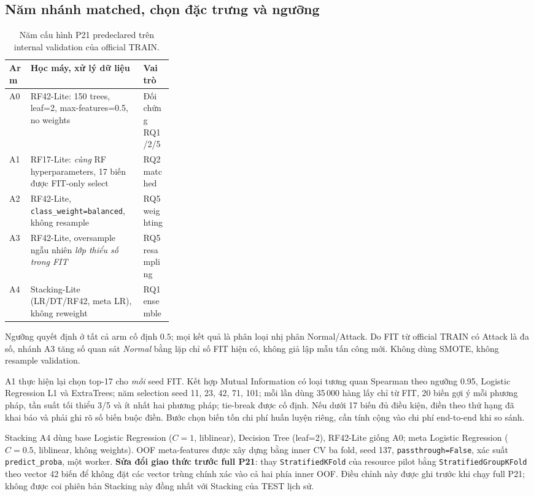 \subsection{Năm nhánh matched, chọn đặc trưng và ngưỡng}
\begin{table}[htbp]\centering\small
\renewcommand{\arraystretch}{1.20}
\setlength{\tabcolsep}{5pt}
\caption{Năm cấu hình P21 predeclared trên internal validation của official TRAIN.}
\label{tab:p21-arms-method}
\begin{tabularx}{\linewidth}{p{0.13\linewidth}X p{0.18\linewidth}}
\toprule
Arm & Học máy, xử lý dữ liệu & Vai trò\\\midrule
A0 & RF42-Lite: 150 trees, leaf=2, max-features=0.5, no weights & Đối chứng RQ1/2/5\\
A1 & RF17-Lite: \emph{cùng} RF hyperparameters, 17 biến được FIT-only select & RQ2 matched\\
A2 & RF42-Lite, \texttt{class\_weight=balanced}, không resample & RQ5 weighting\\
A3 & RF42-Lite, oversample ngẫu nhiên \emph{lớp thiểu số trong FIT} & RQ5 resampling\\
A4 & Stacking-Lite (LR/DT/RF42, meta LR), không reweight & RQ1 ensemble\\\bottomrule
\end{tabularx}
\end{table}
Ngưỡng quyết định ở tất cả arm cố định $0.5$; mọi kết quả là phân loại nhị phân Normal/Attack. Do FIT từ official TRAIN có Attack là đa số, nhánh A3 tăng số quan sát \emph{Normal} bằng lặp chỉ số FIT hiện có, không giả lập mẫu tấn công mới. Không dùng SMOTE, không resample validation.

A1 thực hiện lại chọn top-17 cho \emph{mỗi} seed FIT. Kết hợp Mutual Information có loại tương quan Spearman theo ngưỡng 0.95, Logistic Regression L1 và ExtraTrees; năm selection seed 11, 23, 42, 71, 101; mỗi lần dùng 35\,000 hàng lấy chỉ từ FIT, 20 biến gợi ý mỗi phương pháp, tần suất tối thiểu 3/5 và ít nhất hai phương pháp; tie-break được cố định. Nếu dưới 17 biến đủ điều kiện, điền theo thứ hạng đã khai báo và phải ghi rõ số biến buộc điền. Bước chọn biến tốn chi phí huấn luyện riêng, cần tính cộng vào chi phí end-to-end khi so sánh.

Stacking A4 dùng base Logistic Regression ($C=1$, liblinear), Decision Tree (leaf=2), RF42-Lite giống A0; meta Logistic Regression ($C=0.5$, liblinear, không weights). OOF meta-features được xây dựng bằng inner CV ba fold, seed 137, \texttt{passthrough=False}, xác suất \texttt{predict\_proba}, một worker. \textbf{Sửa đổi giao thức trước full P21}: thay \texttt{StratifiedKFold} của resource pilot bằng \texttt{StratifiedGroupKFold} theo vector 42 biến để không đặt các vector trùng chính xác vào cả hai phía inner OOF. Điều chỉnh này được ghi trước khi chạy full P21; không được coi phiên bản Stacking này đồng nhất với Stacking của TEST lịch sử.

